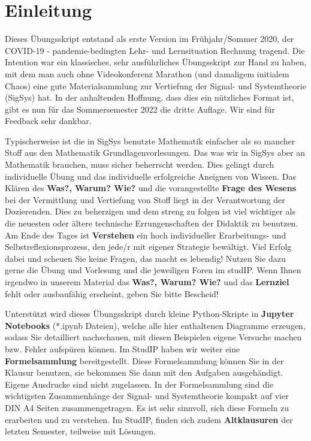\newpage
\section*{Einleitung}
%

Dieses Übungsskript entstand als erste Version im Frühjahr/Sommer 2020, der
COVID-19 - pandemie-bedingten Lehr- und Lernsituation Rechnung tragend.
%
Die Intention war ein klassisches, sehr ausführliches Übungsskript zur Hand zu haben,
mit dem man auch ohne Videokonferenz Marathon (und damaligem initialem Chaos)
eine gute Materialsammlung zur Vertiefung der Signal- und Systemtheorie (SigSys)
hat.
%
In der anhaltenden Hoffnung, dass dies ein nützliches Format ist, gibt es nun
für das Sommersemester 2022 die dritte Auflage. Wir sind für Feedback
sehr dankbar.

Typischerweise ist die in SigSys benutzte Mathematik einfacher als so mancher
Stoff aus den Mathematik Grundlagenvorlesungen.
%
Das was wir in SigSys aber an Mathematik brauchen, muss sicher beherrscht werden.
%
Dies gelingt durch individuelle Übung und das individuelle erfolgreiche Aneignen
von Wissen.
%
Das Klären des \textbf{Was?, Warum? Wie?} und die vorangestellte
\textbf{Frage des Wesens} bei der Vermittlung und Vertiefung von Stoff liegt
in der Verantwortung der Dozierenden.
%
Dies zu beherzigen und dem streng zu folgen ist viel wichtiger als die neuesten
oder ältere technische Errungenschaften der Didaktik zu benutzen.
%
Am Ende des Tages ist \textbf{Verstehen} ein hoch individueller Erarbeitungs-
und Selbstreflexionsprozess, den jede/r mit eigener Strategie bewältigt.
%
Viel Erfolg dabei und scheuen Sie keine Fragen, das macht es lebendig!
Nutzen Sie dazu gerne die Übung und Vorlesung und die
jeweiligen Foren im studIP.
%
Wenn Ihnen irgendwo in unserem Material das \textbf{Was?, Warum? Wie?} und das
\textbf{Lernziel} fehlt oder ausbaufähig erscheint, geben Sie bitte Bescheid!

%
Unterstützt wird dieses Übungsskript durch kleine Python-Skripte in
\textbf{Jupyter Notebooks} (*.ipynb Dateien),
welche alle hier enthaltenen Diagramme erzeugen, sodass Sie
detailliert nachschauen, mit diesen Beispielen eigene Versuche machen
bzw. Fehler aufspüren können.
%
Im StudIP haben wir weiter eine \textbf{Formelsammlung} bereitgestellt.
%
Diese Formelsammlung können Sie in der Klausur benutzen, sie bekommen Sie
dann mit den Aufgaben ausgehändigt.
%
Eigene Ausdrucke sind nicht zugelassen.
%
In der Formelsammlung sind die wichtigsten Zusammenhänge der Signal- und
Systemtheorie kompakt auf vier DIN A4 Seiten zusammengetragen.
%
Es ist sehr sinnvoll, sich diese Formeln zu erarbeiten und zu verstehen.
%
Im StudIP, finden sich zudem \textbf{Altklausuren} der letzten Semester,
teilweise mit Lösungen.

